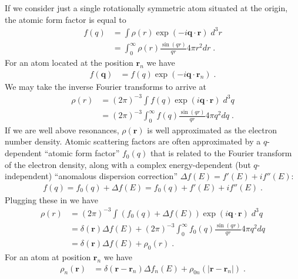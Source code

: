\documentclass[11pt]{article}
\renewcommand{\vec}[1]{\boldsymbol{#1}}
\begin{document}
If we consider just a single rotationally symmetric atom situated at the origin, the atomic form factor is equal to
\begin{align}
f(q)  &= \int \rho(r) \exp(-i \vec{q}\cdot\vec{r}) \; d^3r \\
  &= \int_0^\infty \rho(r)   \frac{\sin(qr)}{qr}  4\pi r^2 dr \; . \label{eqn:form}
\end{align}
For an atom located at the position $\vec{r}_n$ we have
\begin{align}
f(\vec{q})  &= f(q)\exp(-i \vec{q}\cdot\vec{r}_n)  \; .
\end{align}
We may take the inverse Fourier transforms to arrive at %
\begin{align}
\rho(r)  &= (2\pi)^{-3} \int  f(q)  \exp(i \vec{q}\cdot\vec{r}) \; d^3q \\
&= (2\pi)^{-3} \int_0^\infty f(q)   \frac{\sin(qr)}{qr}  4\pi q^2 dq \; . \label{rhor}
\end{align}
If we are well above resonances, $\rho(\vec{r})$ is well approximated as the electron number density.    Atomic scattering factors are often approximated by a $q$-dependent ``atomic form factor'' $f_0(q)$  that is related to the Fourier transform of the electron density, along with a complex energy-dependent (but $q$-independent) ``anomalous dispersion correction'' $\Delta f(E) =  f'(E) + i f''(E)$: 
\begin{align}
f(q) = f_0(q) + \Delta f(E) = f_0(q) + f'(E) + i f''(E)  \;.
\end{align}
Plugging these in we have
\begin{align}
\rho(r)  &= (2\pi)^{-3} \int  (f_0(q) + \Delta f(E))   \exp(i \vec{q}\cdot\vec{r}) \; d^3q \\
&=  \delta(\vec{r}) \Delta f(E) + (2\pi)^{-3} \int_0^\infty f_0(q)    \frac{\sin(qr)}{qr}  4\pi q^2 dq  \\
&=  \delta(\vec{r}) \Delta f(E) + \rho_0(r) \; .
\end{align}
For an atom at position $\vec{r}_n$ we have
\begin{align}
\rho_n(\vec{r})  &=  \delta(\vec{r}-\vec{r}_n) \Delta f_n(E) + \rho_{0n}(|\vec{r}-\vec{r}_n|) \; .
\end{align}
\end{document}
